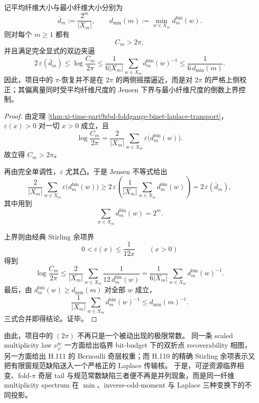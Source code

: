 \begin{corollary}\label{cor:xi-time-part9zbd-foldgauge-jensen-sandwich}
记平均纤维大小与最小纤维大小分别为
\[
\bar d_m:=\frac{2^m}{|X_m|},
\qquad
d_{\min}(m):=\min_{w\in X_m}d_m^{\mathrm{bin}}(w).
\]
则对每个 \(m\ge 1\) 都有
\[
C_m>2\pi,
\]
并且满足完全显式的双边夹逼
\[
2\,\varepsilon(\bar d_m)
\le
\log\frac{C_m}{2\pi}
\le
\frac{1}{6|X_m|}\sum_{w\in X_m}d_m^{\mathrm{bin}}(w)^{-1}
\le
\frac{1}{6\,d_{\min}(m)}.
\]
因此，项目中的 \(\pi\)-恢复并不是在 \(2\pi\) 的两侧摇摆逼近，而是对 \(2\pi\) 的严格上侧校正；其偏离量同时受平均纤维尺度的 Jensen 下界与最小纤维尺度的倒数上界控制。
\end{corollary}
\begin{proof}
由定理 \ref{thm:xi-time-part9zbd-foldgauge-binet-laplace-transport}，\(\varepsilon(x)>0\) 对一切 \(x>0\) 成立，且
\[
\log\frac{C_m}{2\pi}
=
\frac{2}{|X_m|}\sum_{w\in X_m}\varepsilon\bigl(d_m^{\mathrm{bin}}(w)\bigr).
\]
故立得 \(C_m>2\pi\)。

再由完全单调性，\(\varepsilon\) 尤其凸。于是 Jensen 不等式给出
\[
\frac{2}{|X_m|}\sum_{w\in X_m}\varepsilon\bigl(d_m^{\mathrm{bin}}(w)\bigr)
\ge
2\,\varepsilon\!\left(
\frac1{|X_m|}\sum_{w\in X_m}d_m^{\mathrm{bin}}(w)
\right)
=
2\,\varepsilon(\bar d_m),
\]
其中用到
\[
\sum_{w\in X_m}d_m^{\mathrm{bin}}(w)=2^m.
\]

上界则由经典 Stirling 余项界
\[
0<\varepsilon(x)\le \frac{1}{12x}
\qquad (x>0)
\]
得到
\[
\log\frac{C_m}{2\pi}
\le
\frac{2}{|X_m|}\sum_{w\in X_m}\frac{1}{12\,d_m^{\mathrm{bin}}(w)}
=
\frac{1}{6|X_m|}\sum_{w\in X_m}d_m^{\mathrm{bin}}(w)^{-1}.
\]
最后，由 \(d_m^{\mathrm{bin}}(w)\ge d_{\min}(m)\) 对全部 \(w\) 成立，
\[
\frac{1}{|X_m|}\sum_{w\in X_m}d_m^{\mathrm{bin}}(w)^{-1}
\le
d_{\min}(m)^{-1}.
\]
三式合并即得结论。证毕。
\end{proof}

\noindent
由此，项目中的 \((2\pi)\) 不再只是一个被动出现的极限常数。
同一条 scaled multiplicity law \(\nu_\varphi^{\mathrm{sc}}\) 一方面给出临界 bit-budget 下的双折点 recoverability 相图，另一方面给出 H.111 的 Bernoulli 奇层权重；而 H.110 的精确 Stirling 余项表示又把有限窗规范缺陷送入一个严格正的 Laplace 传输核。
于是，可逆资源临界相变、fold-\(\pi\) 奇层 tail 与规范常数缺陷三者便不再是并列现象，而是同一纤维 multiplicity spectrum 在 \(\min\)、inverse-odd-moment 与 Laplace 三种变换下的不同投影。

\endinput
